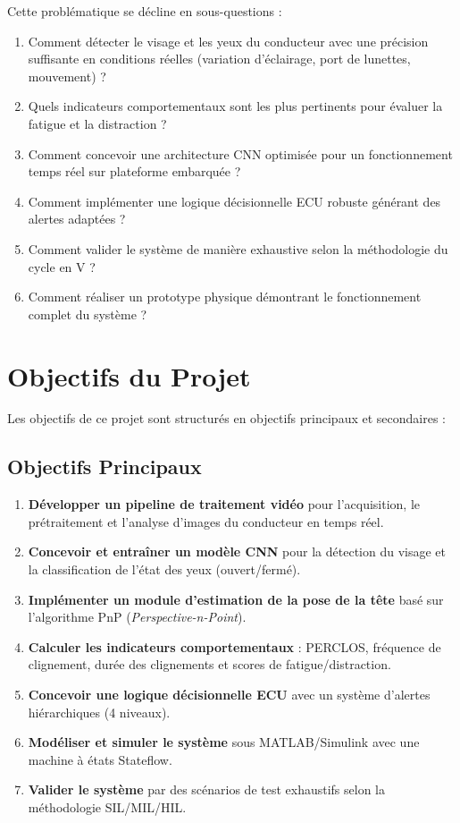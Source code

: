 Cette problématique se décline en sous-questions :
\begin{enumerate}[leftmargin=2cm]
    \item Comment détecter le visage et les yeux du conducteur avec une précision suffisante en conditions réelles (variation d'éclairage, port de lunettes, mouvement) ?
    \item Quels indicateurs comportementaux sont les plus pertinents pour évaluer la fatigue et la distraction ?
    \item Comment concevoir une architecture CNN optimisée pour un fonctionnement temps réel sur plateforme embarquée ?
    \item Comment implémenter une logique décisionnelle ECU robuste générant des alertes adaptées ?
    \item Comment valider le système de manière exhaustive selon la méthodologie du cycle en V ?
    \item Comment réaliser un prototype physique démontrant le fonctionnement complet du système ?
\end{enumerate}

\section{Objectifs du Projet}

Les objectifs de ce projet sont structurés en objectifs principaux et secondaires :

\subsection{Objectifs Principaux}

\begin{enumerate}[leftmargin=2cm]
    \item \textbf{Développer un pipeline de traitement vidéo} pour l'acquisition, le prétraitement et l'analyse d'images du conducteur en temps réel.
    \item \textbf{Concevoir et entraîner un modèle CNN} pour la détection du visage et la classification de l'état des yeux (ouvert/fermé).
    \item \textbf{Implémenter un module d'estimation de la pose de la tête} basé sur l'algorithme PnP (\textit{Perspective-n-Point}).
    \item \textbf{Calculer les indicateurs comportementaux} : PERCLOS, fréquence de clignement, durée des clignements et scores de fatigue/distraction.
    \item \textbf{Concevoir une logique décisionnelle ECU} avec un système d'alertes hiérarchiques (4 niveaux).
    \item \textbf{Modéliser et simuler le système} sous MATLAB/Simulink avec une machine à états Stateflow.
    \item \textbf{Valider le système} par des scénarios de test exhaustifs selon la méthodologie SIL/MIL/HIL.
\end{enumerate}

